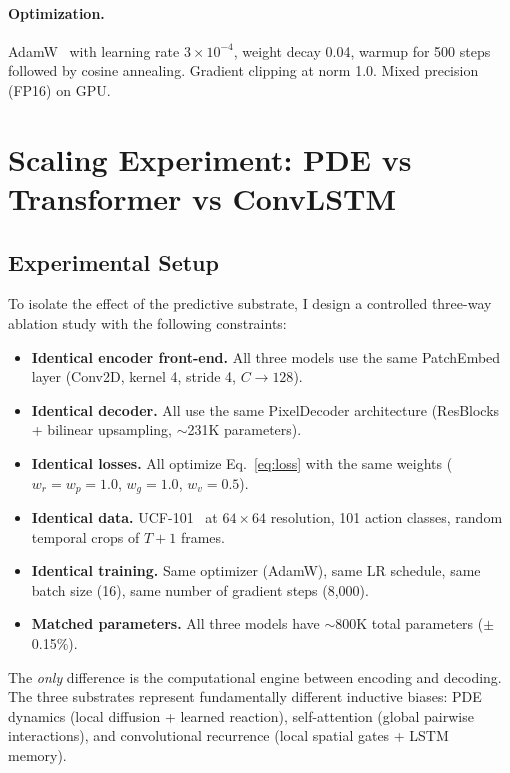 \documentclass{article}
\begin{document}
\paragraph{Optimization.} AdamW~\cite{loshchilov2019adamw} with learning rate $3 \times 10^{-4}$, weight decay 0.04, warmup for 500 steps followed by cosine annealing. Gradient clipping at norm 1.0. Mixed precision (FP16) on GPU.

\section{Scaling Experiment: PDE vs Transformer vs ConvLSTM}
\label{sec:experiments}

\subsection{Experimental Setup}

To isolate the effect of the predictive substrate, I design a controlled three-way ablation study with the following constraints:

\begin{itemize}
    \item \textbf{Identical encoder front-end.} All three models use the same PatchEmbed layer (Conv2D, kernel 4, stride 4, $C \to 128$).
    \item \textbf{Identical decoder.} All use the same PixelDecoder architecture (ResBlocks + bilinear upsampling, $\sim$231K parameters).
    \item \textbf{Identical losses.} All optimize Eq.~\ref{eq:loss} with the same weights ($w_r = w_p = 1.0$, $w_g = 1.0$, $w_v = 0.5$).
    \item \textbf{Identical data.} UCF-101~\cite{soomro2012ucf101} at $64\!\times\!64$ resolution, 101 action classes, random temporal crops of $T\!+\!1$ frames.
    \item \textbf{Identical training.} Same optimizer (AdamW), same LR schedule, same batch size (16), same number of gradient steps (8,000).
    \item \textbf{Matched parameters.} All three models have $\sim$800K total parameters ($\pm$0.15\%).
\end{itemize}

The \emph{only} difference is the computational engine between encoding and decoding. The three substrates represent fundamentally different inductive biases: PDE dynamics (local diffusion + learned reaction), self-attention (global pairwise interactions), and convolutional recurrence (local spatial gates + LSTM memory).
\end{document}
